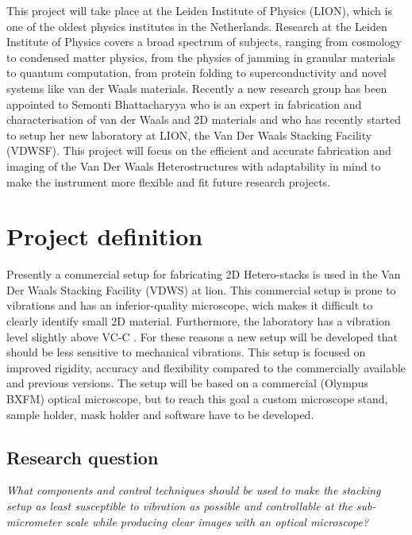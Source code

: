 \documentclass[11pt]{article}
\begin{document}
This project will take place at the Leiden Institute of Physics (LION), which is one of the oldest physics institutes in the Netherlands.
Research at the Leiden Institute of Physics covers a broad spectrum of subjects, ranging from cosmology to condensed matter physics, from the physics of jamming in granular materials to quantum computation, from protein folding to superconductivity and novel systems like van der
Waals materials. 
Recently a new research group has been appointed to Semonti Bhattacharyya who is an expert in fabrication and characterisation of van der Waals and 2D materials and who has recently started to setup her new laboratory at LION, the Van Der Waals Stacking Facility (VDWSF). This project will focus on the efficient and accurate fabrication and imaging of the Van Der Waals Heterostructures with adaptability in mind to make the instrument more flexible and fit future research projects.


\clearpage
\section{Project definition}
\noindent Presently a commercial setup for fabricating 2D Hetero-stacks is used in the Van Der Waals Stacking Facility (VDWS) at lion. 
This commercial setup is prone to vibrations and has an inferior-quality microscope, wich makes it difficult to clearly identify small 2D material.
Furthermore, the laboratory has a vibration level slightly above VC-C \citep{isolationVibrationCriterionVC}.
For these reasons a new setup will be developed that should be less sensitive to mechanical vibrations.
This setup is focused on improved rigidity, accuracy and flexibility compared to the commercially available and previous versions.
The setup will be based on a commercial (Olympus BXFM) optical microscope, but to reach this goal a custom microscope stand, sample holder, mask holder and software have to be developed.

\subsection{Research question}
\begin{center}
    \textit{What components and control techniques should be used to make the stacking setup as least susceptible to vibration as possible and controllable at the sub-micrometer scale while producing clear images with an optical microscope?}
\end{center}
\end{document}
